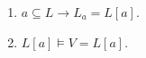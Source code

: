 \begin{enumerate}
\item $a \subseteq L \rightarrow L_a = L[a]$.
\item $L[a] \models V = L[a]$.
\end{enumerate}
